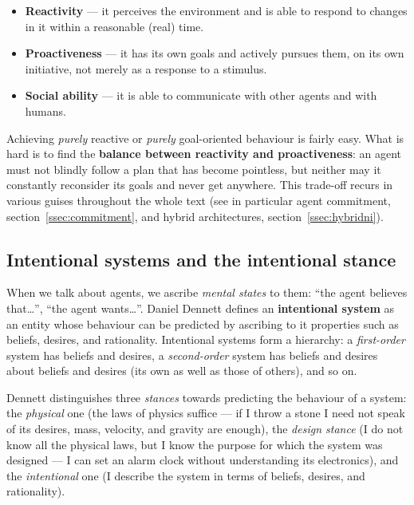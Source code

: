 \documentclass[11pt,a4paper]{article}
\theoremstyle{definition}
\providecommand{\uv}[1]{``#1''}
\begin{document}
\begin{itemize}
\item \textbf{Reactivity} --- it perceives the environment and is able to respond to changes in
  it within a reasonable (real) time.
\item \textbf{Proactiveness} --- it has its own goals and actively pursues them, on its own
  initiative, not merely as a response to a stimulus.
\item \textbf{Social ability} --- it is able to communicate with other agents and with humans.
\end{itemize}

Achieving \emph{purely} reactive or \emph{purely} goal-oriented behaviour is fairly easy. What is
hard is to find the \textbf{balance between reactivity and proactiveness}: an agent must not
blindly follow a plan that has become pointless, but neither may it constantly reconsider its
goals and never get anywhere. This trade-off recurs in various guises throughout the whole text
(see in particular agent commitment, section~\ref{ssec:commitment}, and hybrid
architectures, section~\ref{ssec:hybridni}).

\subsection{Intentional systems and the intentional stance}

When we talk about agents, we ascribe \emph{mental states} to them: \uv{the agent believes
that\dots}, \uv{the agent wants\dots}. Daniel Dennett defines an \textbf{intentional system} as an
entity whose behaviour can be predicted by ascribing to it properties such as beliefs, desires,
and rationality. Intentional systems form a hierarchy: a \emph{first-order} system has beliefs
and desires, a \emph{second-order} system has beliefs and desires about beliefs and desires (its
own as well as those of others), and so on.

Dennett distinguishes three \emph{stances} towards predicting the behaviour of a system: the
\emph{physical} one (the laws of physics suffice --- if I throw a stone I need not speak of its
desires, mass, velocity, and gravity are enough), the \emph{design stance} (I do not know all the
physical laws, but I know the purpose for which the system was designed --- I can set an alarm
clock without understanding its electronics), and the \emph{intentional} one (I describe the
system in terms of beliefs, desires, and rationality).
\end{document}
